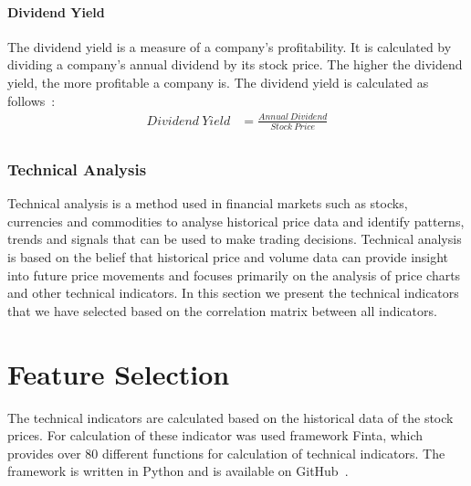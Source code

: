 \documentclass[../xlapes02]{subfiles}
\begin{document}
    \paragraph{Dividend Yield}\label{par:dividend-yield}
    The dividend yield is a measure of a company's profitability. It is calculated by dividing a company's annual dividend by its stock price. The higher the dividend yield, the more profitable a company is. The dividend yield is calculated as follows~\cite{investopedia-dividend-yield}:
    \begin{equation}
        \begin{split}
            Dividend\ Yield&=\frac{Annual\ Dividend}{Stock\ Price}\\
        \end{split}
    \end{equation}

    \subsubsection{Technical Analysis}\label{subsubsec:technical-analysis}
    Technical analysis is a method used in financial markets such as stocks, currencies and commodities to analyse historical price data and identify patterns, trends and signals that can be used to make trading decisions. Technical analysis is based on the belief that historical price and volume data can provide insight into future price movements and focuses primarily on the analysis of price charts and other technical indicators. In this section we present the technical indicators that we have selected based on the correlation matrix between all indicators.


    \section{Feature Selection}\label{sec:feature-selection}
    The technical indicators are calculated based on the historical data of the stock prices. For calculation of these indicator was used framework Finta, which provides over 80 different functions for calculation of technical indicators. The framework is written in Python and is available on GitHub~\cite{finta}.
\end{document}
